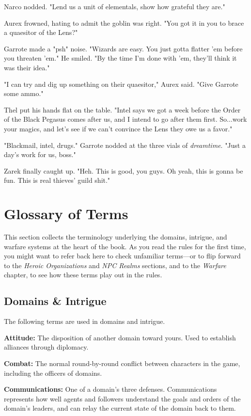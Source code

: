 \documentclass[10pt,a4paper,twoside,bg=print,twocolumn,openany,nodeprecatedcode]{dndbook}
\begin{document}
Narco nodded. "Lend us a unit of elementals, show how grateful they are."

Aurex frowned, hating to admit the goblin was right. "You got it in you to brace a quaesitor of the Lens?"

Garrote made a "psh" noise. "Wizards are easy. You just gotta flatter 'em before you threaten 'em." He smiled. "By the time I'm done with 'em, they'll think it was their idea."

"I can try and dig up something on their quaesitor," Aurex said. "Give Garrote some ammo."

Thel put his hands flat on the table. "Intel says we got a week before the Order of the Black Pegasus comes after us, and I intend to go after them first. So...work your magics, and let's see if we can't convince the Lens they owe us a favor."

"Blackmail, intel, drugs." Garrote nodded at the three vials of \textit{dreamtime}. "Just a day's work for us, boss."

Zarek finally caught up. "Heh. This is good, you guys. Oh yeah, this is gonna be fun. This is real thieves' guild shit."

\section{Glossary of Terms}
This section collects the terminology underlying the domains, intrigue, and warfare systems at the heart of the book. As you read the rules for the first time, you might want to refer back here to check unfamiliar terms—or to flip forward to the \textit{Heroic Organizations} and \textit{NPC Realms} sections, and to the \textit{Warfare} chapter, to see how these terms play out in the rules.

\subsection{Domains \& Intrigue}
The following terms are used in domains and intrigue.

\textbf{Attitude:} The disposition of another domain toward yours. Used to establish alliances through diplomacy.

\textbf{Combat:} The normal round-by-round conflict between characters in the game, including the officers of domains.

\textbf{Communications:} One of a domain's three defenses. Communications represents how well agents and followers understand the goals and orders of the domain's leaders, and can relay the current state of the domain back to them.
\end{document}
